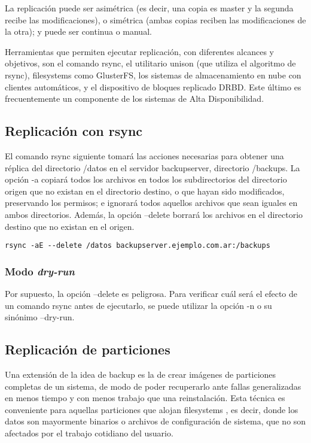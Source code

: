  
La replicación puede ser asimétrica (es decir, una copia es master y la segunda recibe las modificaciones), o simétrica (ambas copias reciben las modificaciones de la otra); y puede ser continua o manual. 

Herramientas que permiten ejecutar replicación, con diferentes alcances y objetivos, son el comando rsync, el utilitario unison (que utiliza el algoritmo de rsync), filesystems como GlusterFS, los sistemas de almacenamiento en nube con clientes automáticos, y el dispositivo de bloques replicado DRBD. Este último es frecuentemente un componente de los sistemas de Alta Disponibilidad. 


\subsection{Replicación con rsync}

El comando rsync siguiente tomará las acciones necesarias para obtener una réplica del directorio /datos en el servidor backupserver, directorio /backups. La opción -a copiará todos los archivos en todos los subdirectorios del directorio origen que no existan en el directorio destino, o que hayan sido modificados, preservando los permisos; e ignorará todos aquellos archivos que sean iguales en ambos directorios. Además, la opción --delete borrará los archivos en el directorio destino que no existan en el origen. 

\lstinline$rsync -aE --delete /datos backupserver.ejemplo.com.ar:/backups$

\subsubsection{Modo \emph{dry-run}}

Por supuesto, la opción –delete es peligrosa. Para verificar cuál será el efecto de un comando rsync antes de ejecutarlo, se puede utilizar la opción -n o su sinónimo –dry-run.

\subsection{Replicación de particiones}

Una extensión de la idea de backup es la de crear imágenes de particiones completas de un sistema, de modo de poder recuperarlo ante fallas generalizadas en menos tiempo y con menos trabajo que una reinstalación. Esta técnica es conveniente para aquellas particiones que alojan filesystems , es decir, donde los datos son mayormente binarios o archivos de configuración de sistema, que no son afectados por el trabajo cotidiano del usuario.

